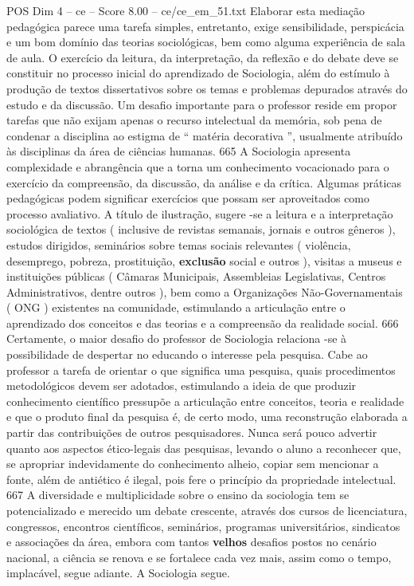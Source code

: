 \begin{textsample}{POS Dim 4 – ce – Score 8.00 – ce/ce\_em\_51.txt}
Elaborar esta mediação pedagógica parece uma tarefa simples, entretanto, exige sensibilidade, perspicácia e um bom domínio das teorias sociológicas, bem como alguma experiência de sala de aula.
O exercício da leitura, da interpretação, da reflexão e do debate deve se constituir no processo inicial do aprendizado de Sociologia, além do estímulo à produção de textos dissertativos sobre os temas e problemas depurados através do estudo e da discussão.
Um desafio importante para o professor reside em propor tarefas que não exijam apenas o recurso intelectual da memória, sob pena de condenar a disciplina ao estigma de “ matéria decorativa ”, usualmente atribuído às disciplinas da área de ciências humanas. 665 A Sociologia apresenta complexidade e abrangência que a torna um conhecimento vocacionado para o exercício da compreensão, da discussão, da análise e da crítica.
Algumas práticas pedagógicas podem significar exercícios que possam ser aproveitados como processo avaliativo.
A título de ilustração, sugere -se a leitura e a interpretação sociológica de textos ( inclusive de revistas semanais, jornais e outros gêneros ), estudos dirigidos, seminários sobre temas sociais relevantes ( violência, desemprego, pobreza, prostituição, \textbf{exclusão} social e outros ), visitas a museus e instituições públicas ( Câmaras Municipais, Assembleias Legislativas, Centros Administrativos, dentre outros ), bem como a Organizações Não-Governamentais ( ONG ) existentes na comunidade, estimulando a articulação entre o aprendizado dos conceitos e das teorias e a compreensão da realidade social. 666 Certamente, o maior desafio do professor de Sociologia relaciona -se à possibilidade de despertar no educando o interesse pela pesquisa.
Cabe ao professor a tarefa de orientar o que significa uma pesquisa, quais procedimentos metodológicos devem ser adotados, estimulando a ideia de que produzir conhecimento científico pressupõe a articulação entre conceitos, teoria e realidade e que o produto final da pesquisa é, de certo modo, uma reconstrução elaborada a partir das contribuições de outros pesquisadores.
Nunca será pouco advertir quanto aos aspectos ético-legais das pesquisas, levando o aluno a reconhecer que, se apropriar indevidamente do conhecimento alheio, copiar sem mencionar a fonte, além de antiético é ilegal, pois fere o princípio da propriedade intelectual. 667 A diversidade e multiplicidade sobre o ensino da sociologia tem se potencializado e merecido um debate crescente, através dos cursos de licenciatura, congressos, encontros científicos, seminários, programas universitários, sindicatos e associações da área, embora com tantos \textbf{velhos} desafios postos no cenário nacional, a ciência se renova e se fortalece cada vez mais, assim como o tempo, implacável, segue adiante.
A Sociologia segue.

\end{textsample}
